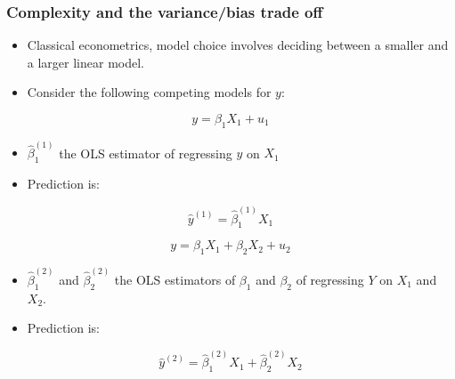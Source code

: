 \documentclass[
  shownotes,
  xcolor={svgnames},
  hyperref={colorlinks,citecolor=DarkBlue,linkcolor=andesred,urlcolor=DarkBlue}
  , aspectratio=169]{beamer}
\begin{document}
\begin{frame}
\frametitle{Complexity and the variance/bias trade off}

\begin{itemize}
\item Classical econometrics, model choice involves deciding between a smaller and a larger linear model. 

\item Consider the following competing models for $y$:

\end{itemize}



\begin{minipage}[t]{0.48\linewidth}

          \begin{equation} 
          y=\beta_1 X_1 + u_1 \nonumber
          \end{equation}
        \begin{itemize}
          \item $\hat \beta^{(1)}_1$ the OLS estimator of regressing $y$ on $X_1$
          \medskip
          \item Prediction is:
        \end{itemize}
        \bigskip
          \begin{equation}\label{eq:3_2_3}
          \hat{y}^{(1)}=\hat{\beta}^{(1)}_1 X_1 \nonumber
          \end{equation}
    
    \end{minipage}
    \hfill
    \begin{minipage}[t]{0.48\linewidth}%
        

        \begin{equation}
          y=\beta_1 X_1 + \beta_2 X_2 + u_2 \nonumber
        \end{equation}
      \begin{itemize}
          \item  $\hat \beta^{(2)}_1$ and $\hat \beta^{(2)}_2$ the OLS estimators of $\beta_1$ and $\beta_2$ of regressing $Y$ on $X_1$ and $X_2$. 
          \item Prediction is:
      \end{itemize}

      \begin{equation}\label{eq:3_2_4}
      \hat{y}^{(2)}=\hat{\beta}^{(2)}_1 X_1 + \hat{\beta}^{(2)}_2 X_2  \nonumber
      \end{equation}

    \end{minipage}
 
\end{frame}
\end{document}
